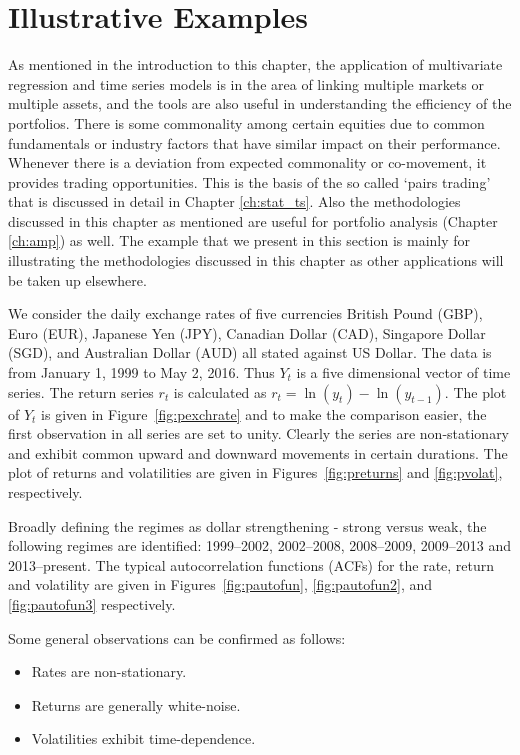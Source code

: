 \section{Illustrative Examples}


As mentioned in the introduction to this chapter, the application of multivariate regression and time series models is in the area of linking multiple markets or multiple assets, and the tools are also useful in understanding the efficiency of the portfolios. There is some commonality among certain equities due to common fundamentals or industry factors that have similar impact on their performance. Whenever there is a deviation from expected commonality or co-movement, it provides trading opportunities. This is the basis of the so called `pairs trading' that is discussed in detail in Chapter \ref{ch:stat_ts}. Also the methodologies discussed in this chapter as mentioned are useful for portfolio analysis (Chapter \ref{ch:amp}) as well. The example that we present in this section is mainly for illustrating the methodologies discussed in this chapter as other applications will be taken up elsewhere.


We consider the daily exchange rates of five currencies British Pound (GBP), Euro (EUR), Japanese Yen (JPY), Canadian Dollar (CAD), Singapore Dollar (SGD), and Australian Dollar (AUD) all stated against US Dollar. The data is from January 1, 1999 to May 2, 2016. Thus $Y_t$ is a five dimensional vector of time series. The return series $r_t$ is calculated as $r_t=\ln(y_t) - \ln(y_{t-1})$. The plot of $Y_t$ is given in Figure~\ref{fig:pexchrate} and to make the comparison easier, the first observation in all series are set to unity. Clearly the series are non-stationary and exhibit common upward and downward movements in certain durations. The plot of returns and volatilities are given in Figures~\ref{fig:preturns} and \ref{fig:pvolat}, respectively. 


Broadly defining the regimes as dollar strengthening - strong versus weak, the following regimes are identified: 1999--2002, 2002--2008, 2008--2009, 2009--2013 and 2013--present. The typical autocorrelation functions (ACFs) for the rate, return and volatility are given in Figures~\ref{fig:pautofun}, \ref{fig:pautofun2}, and \ref{fig:pautofun3} respectively.


Some general observations can be confirmed as follows:
	\begin{itemize}
	\item Rates are non-stationary.
	\item Returns are generally white-noise.
	\item Volatilities exhibit time-dependence.
	\end{itemize}


